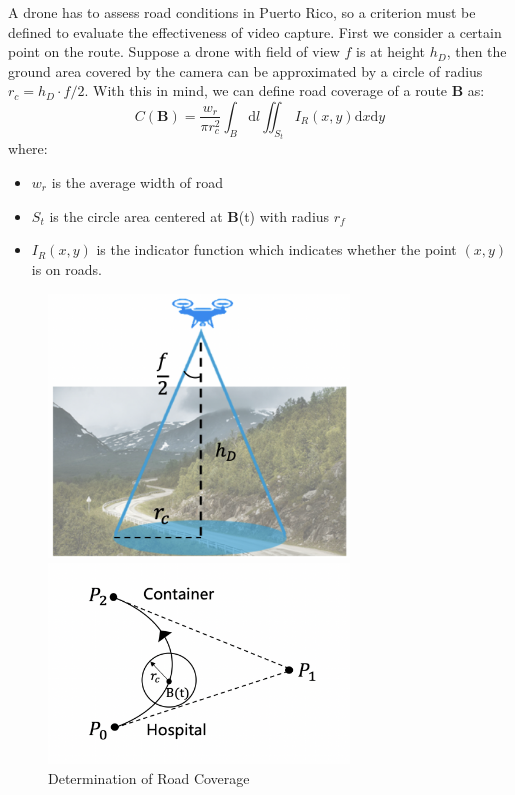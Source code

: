 \documentclass{mcmthesis}
\begin{document}
A drone has to assess road conditions in Puerto Rico, so a criterion must be defined to evaluate the effectiveness of video capture. First we consider a certain point on the route. Suppose a drone with field of view \cite{FieldOfView} $f$ is at height $h_D$, then the ground area covered by the camera can be approximated by a circle of radius $r_c = h_D \cdot f/2$. With this in mind, we can define road coverage of a route $\mathbf{B}$ as:
\begin{equation}
    C(\mathbf{B}) = \frac{w_r}{\pi r_c^2} \int_B\mathrm{d}l \iint_{S_t} I_R(x, y) \mathrm{d}x\mathrm{d}y
    \label{Equ:rtcv}
\end{equation}
where:
\begin{itemize}
    \item $w_r$ is the average width of road
    \item $S_t$ is the circle area centered at $\mathbf{B}$(t) with radius $r_f$
    \item $I_{R}(x, y)$ is the indicator function which indicates whether the point $(x, y)$ is on roads.
\end{itemize}

\begin{figure}[ht]
	\centering
	\begin{minipage}[t]{0.48\textwidth}
		\centering
		\includegraphics[width=8cm,height=7cm]{figures/fov.png}
	\end{minipage}
	\begin{minipage}[t]{0.48\textwidth}
		\centering
		\includegraphics[width=8cm]{figures/route_coverage.png}
	\end{minipage}
	\caption{Determination of Road Coverage}
	\label{Fig:rdcv}
\end{figure}
\end{document}
